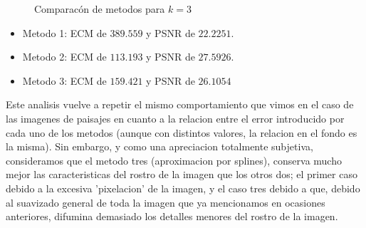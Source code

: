 \begin{figure}[H]
    \centering
    \qquad
    \qquad
    \caption{Comparacón de metodos para $k = 3$}
    \label{fig:example}
\end{figure}


\begin{itemize}
 \item Metodo 1: ECM de $389.559$ y PSNR de $22.2251$.
 \item Metodo 2: ECM de $113.193$ y PSNR de $27.5926$.
 \item Metodo 3: ECM de $159.421$ y PSNR de $26.1054$
\end{itemize}

Este analisis vuelve a repetir el mismo comportamiento que vimos en el caso de las imagenes de paisajes en cuanto a la relacion entre el error introducido por cada uno de los metodos (aunque con distintos valores, la relacion en el fondo es la misma). Sin embargo, y como una apreciacion totalmente subjetiva, consideramos que el metodo tres (aproximacion por splines), conserva mucho mejor las caracteristicas del rostro de la imagen que los otros dos; el primer caso debido a la excesiva 'pixelacion' de la imagen, y el caso tres debido a que, debido al suavizado general de toda la imagen que ya mencionamos en ocasiones anteriores, difumina demasiado los detalles menores del rostro de la imagen.

